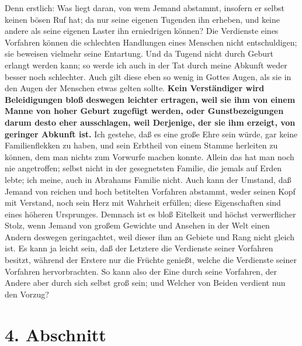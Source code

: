 Denn erstlich: Was liegt daran, von wem Jemand
abstammt, insofern er selbst
keinen bösen Ruf hat; da nur seine eigenen Tugenden ihn erheben, und keine
andere als seine eigenen Laster ihn erniedrigen können? Die Verdienste eines
Vorfahren können die schlechten Handlungen eines Menschen nicht
entschuldigen;
sie beweisen vielmehr seine Entartung. Und da Tugend nicht durch Geburt erlangt
werden kann; so werde ich auch in der Tat durch meine Abkunft weder besser noch
schlechter. Auch gilt diese eben so wenig in Gottes Augen, als sie in den Augen
der Menschen etwas gelten sollte. \textbf{Kein Verständiger wird Beleidigungen
bloß
deswegen leichter ertragen, weil sie ihm von einem Manne von hoher Geburt
zugefügt werden, oder Gunstbezeigungen darum desto eher ausschlagen, weil
Derjenige, der sie ihm erzeigt, von geringer Abkunft ist.} Ich gestehe, daß es
eine große Ehre sein würde, gar keine Familienflekken zu haben, und sein
Erbtheil von einem Stamme herleiten zu können, dem man nichts zum Vorwurfe
machen konnte. Allein das hat man noch nie angetroffen; selbst nicht in der
gesegnetsten Familie, die jemals auf Erden lebte; ich meine, auch in
Abrahams
Familie nicht. Auch kann der Umstand, daß Jemand von reichen und hoch betitelten
Vorfahren abstammt, weder seinen Kopf mit Verstand, noch sein Herz mit Wahrheit
erfüllen; diese Eigenschaften sind eines höheren Ursprunges. Demnach ist es bloß
Eitelkeit und höchst verwerflicher Stolz, wenn Jemand von großem
Gewichte und
Ansehen in der Welt einen Andern deswegen geringachtet, weil dieser ihm an
Gebiete und Rang nicht gleich ist. Es kann ja leicht sein, daß der Letztere die
Verdienste seiner Vorfahren besitzt, während der Erstere nur die Früchte
genießt, welche die Verdienste seiner Vorfahren hervorbrachten. So kann also der
Eine durch seine Vorfahren, der Andere aber durch sich selbst groß sein; und
Welcher von Beiden verdient nun den Vorzug?

\section{4. Abschnitt} \label{kap11_ab4}

